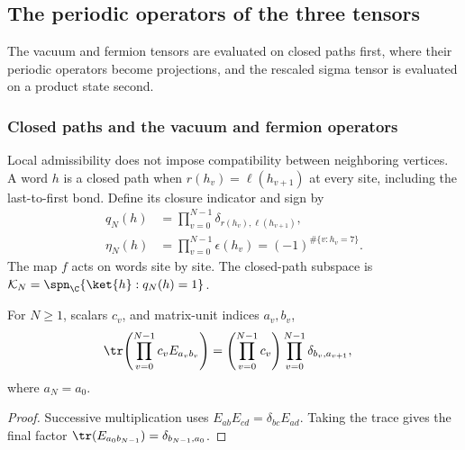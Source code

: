 \subsection{The periodic operators of the three tensors}

The vacuum and fermion tensors are evaluated on closed paths first,
where their periodic operators become projections, and the rescaled
sigma tensor is evaluated on a product state second.

\subsubsection{Closed paths and the vacuum and fermion operators}

Local admissibility does not impose compatibility between neighboring
vertices. A word $h$ is a closed path when
$r(h_v)=\ell(h_{v+1})$ at every site, including the last-to-first bond.
Define its closure indicator and sign by
\begin{align}
    q_N(h)    & =\prod_{v=0}^{N-1}\delta_{r(h_v),\ell(h_{v+1})},
    \label{eq:asymex_ising_closure}                              \\
    \eta_N(h) & =\prod_{v=0}^{N-1}\epsilon(h_v)
    =(-1)^{\#\{v:h_v=7\}}.
    \label{eq:asymex_ising_path_sign}
\end{align}
The map $f$ acts on words site by site.
The closed-path subspace is
$\mathcal K_N=\spn_{\C}\{\ket{h}:q_N(h)=1\}$.

\begin{lemma}%
    \label{lem:asymex_ising_unit_loop}
    \leanok
    For $N\geq1$, scalars $c_v$, and matrix-unit indices $a_v,b_v$,
    \begin{align}
        \tr\!\left(\prod_{v=0}^{N-1}c_vE_{a_vb_v}\right)
         & =\left(\prod_{v=0}^{N-1}c_v\right)
        \prod_{v=0}^{N-1}\delta_{b_v,a_{v+1}},
        \label{eq:asymex_ising_unit_loop}
    \end{align}
    where $a_N=a_0$.
\end{lemma}

\begin{proof}
    \leanok
    Successive multiplication uses $E_{ab}E_{cd}=\delta_{bc}E_{ad}$.
    Taking the trace gives the final factor
    $\tr(E_{a_0b_{N-1}})=\delta_{b_{N-1},a_0}$.
\end{proof}

